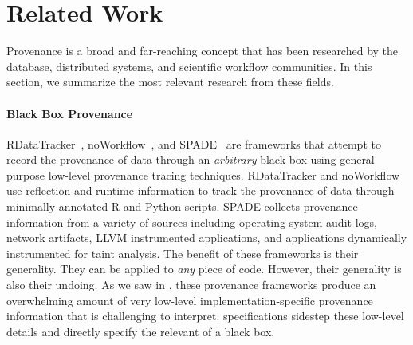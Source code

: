 \section{Related Work}


Provenance is a broad and far-reaching concept that has been researched by the
database, distributed systems, and scientific workflow communities. In this
section, we summarize the most relevant research from these fields.

\paragraph{Black Box Provenance}
RDataTracker~\cite{lerner2014collecting},
noWorkflow~\cite{murta2014noworkflow}, and SPADE~\cite{gehani2012spade} are
frameworks that attempt to record the provenance of data through an
\emph{arbitrary} black box using general purpose low-level provenance
tracing techniques. RDataTracker and noWorkflow use reflection and runtime
information to track the provenance of data through minimally annotated R and
Python scripts. SPADE collects provenance information from a variety of sources
including operating system audit logs, network artifacts, LLVM instrumented
applications, and applications dynamically instrumented for taint analysis. The
benefit of these frameworks is their generality. They can be applied to
\emph{any} piece of code. However, their generality is also their undoing. As
we saw in , these provenance frameworks produce an
overwhelming amount of very low-level implementation-specific provenance
information that is challenging to interpret. \watprovenance{} specifications
sidestep these low-level details and directly specify the relevant
\watprovenance{} of a black box.

